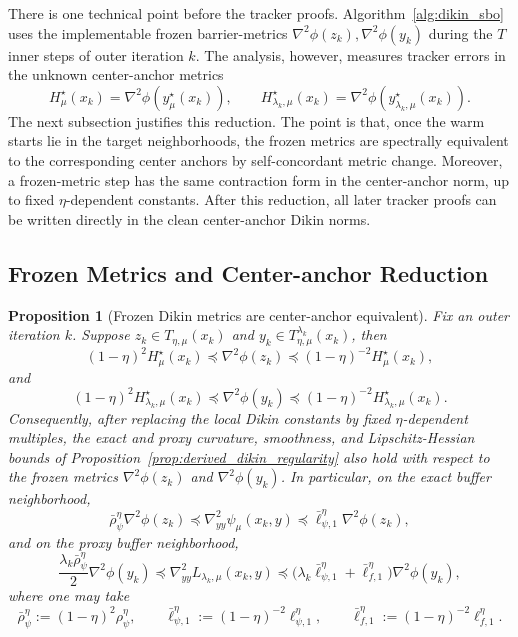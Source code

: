 \documentclass{article}
\newtheorem{proposition}{Proposition}
\begin{document}
There is one technical point before the tracker proofs. Algorithm~\ref{alg:dikin_sbo} uses the
implementable frozen barrier-metrics \(\nabla^2\phi(z_k), \nabla^2\phi(y_k)\)
during the \(T\) inner steps of outer iteration \(k\). The analysis, however, measures tracker errors in
the unknown center-anchor metrics
\[
H_\mu^\star(x_k)=\nabla^2\phi(y_\mu^\star(x_k)),
\qquad
H_{\lambda_k,\mu}^\star(x_k)
=
\nabla^2\phi(y_{\lambda_k,\mu}^\star(x_k)).
\]
The next subsection justifies this reduction. The point is that, once the warm starts lie in the target
neighborhoods, the frozen metrics are spectrally equivalent to the corresponding center anchors by
self-concordant metric change. Moreover, a frozen-metric step has the same contraction form in the
center-anchor norm, up to fixed \(\eta\)-dependent constants. After this reduction, all later tracker
proofs can be written directly in the clean center-anchor Dikin norms.

\subsection{Frozen Metrics and Center-anchor Reduction}
\label{app:frozen_metric_reduction}



\begin{proposition}[Frozen Dikin metrics are center-anchor equivalent]
\label{prop:frozen_metric_equivalence}
Fix an outer iteration \(k\). Suppose
\(z_k\in T_{\eta,\mu}(x_k)\) and
\(y_k\in T_{\eta,\mu}^{\lambda_k}(x_k)\),
then
\[
(1-\eta)^2H_\mu^\star(x_k)
\preceq
\nabla^2\phi(z_k)
\preceq
(1-\eta)^{-2}H_\mu^\star(x_k),
\]
and
\[
(1-\eta)^2H_{\lambda_k,\mu}^\star(x_k)
\preceq
\nabla^2\phi(y_k)
\preceq
(1-\eta)^{-2}H_{\lambda_k,\mu}^\star(x_k).
\]
Consequently, after replacing the local Dikin constants by fixed \(\eta\)-dependent multiples, the
exact and proxy curvature, smoothness, and Lipschitz-Hessian bounds of
Proposition~\ref{prop:derived_dikin_regularity} also hold with respect to the frozen metrics
\(\nabla^2\phi(z_k)\) and \(\nabla^2\phi(y_k)\). In particular, on the exact buffer neighborhood,
\[
\bar\rho_\psi^\eta \nabla^2\phi(z_k)
\preceq
\nabla_{yy}^2\psi_\mu(x_k,y)
\preceq
\bar\ell_{\psi,1}^\eta \nabla^2\phi(z_k),
\]
and on the proxy buffer neighborhood,
\[
\frac{\lambda_k\bar\rho_\psi^\eta}{2}\nabla^2\phi(y_k)
\preceq
\nabla_{yy}^2L_{\lambda_k,\mu}(x_k,y)
\preceq
\bigl(\lambda_k\bar\ell_{\psi,1}^\eta+\bar\ell_{f,1}^\eta\bigr)\nabla^2\phi(y_k),
\]
where one may take
\[
\bar\rho_\psi^\eta:=(1-\eta)^2\rho_\psi^\eta,
\qquad
\bar\ell_{\psi,1}^\eta:=(1-\eta)^{-2}\ell_{\psi,1}^\eta,
\qquad
\bar\ell_{f,1}^\eta:=(1-\eta)^{-2}\ell_{f,1}^\eta.
\]
\end{proposition}
\end{document}
